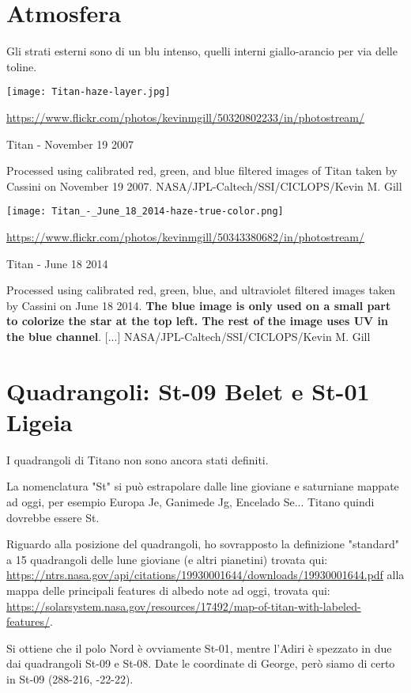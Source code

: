 \documentclass[a4paper,10pt,openany,oneside]{memoir}
\begin{document}
\section{Atmosfera}

Gli strati esterni sono di un blu intenso, quelli interni giallo-arancio per via delle toline. 

\texttt{[image: Titan-haze-layer.jpg]}

\url{https://www.flickr.com/photos/kevinmgill/50320802233/in/photostream/}

Titan - November 19 2007

Processed using calibrated red, green, and blue filtered images of Titan taken by Cassini on November 19 2007. NASA/JPL-Caltech/SSI/CICLOPS/Kevin M. Gill

\hfill 

\texttt{[image: Titan\_-\_June\_18\_2014-haze-true-color.png]}

\url{https://www.flickr.com/photos/kevinmgill/50343380682/in/photostream/}

Titan - June 18 2014

Processed using calibrated red, green, blue, and ultraviolet filtered images taken by Cassini on June 18 2014. \textbf{The blue image is only used on a small part to colorize the star at the top left. The rest of the image uses UV in the blue channel}. [...] NASA/JPL-Caltech/SSI/CICLOPS/Kevin M. Gill


\section{Quadrangoli: St-09 Belet e St-01 Ligeia}
I quadrangoli di Titano non sono ancora stati definiti.

La nomenclatura "St" si può estrapolare dalle line gioviane e saturniane mappate ad oggi, per esempio Europa Je, Ganimede Jg, Encelado Se... Titano quindi dovrebbe essere St.

Riguardo alla posizione del quadrangoli, ho sovrapposto la definizione "standard" a 15 quadrangoli delle lune gioviane (e altri pianetini) trovata qui: \url{https://ntrs.nasa.gov/api/citations/19930001644/downloads/19930001644.pdf} alla mappa delle principali features di albedo note ad oggi, trovata qui: \url{https://solarsystem.nasa.gov/resources/17492/map-of-titan-with-labeled-features/}.

Si ottiene che il polo Nord è ovviamente St-01, mentre l'Adiri è spezzato in due dai quadrangoli St-09 e  St-08. Date le coordinate di George, però siamo di certo in St-09 (288-216, -22-22).
\end{document}
